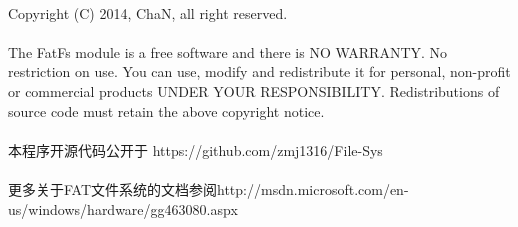 \documentclass{report}
\begin{document}
\begin{CJK}{GBK}{hei}
\paragraph{}
Copyright (C) 2014, ChaN, all right reserved.
\paragraph{}
The FatFs module is a free software and there is NO WARRANTY.
No restriction on use. You can use, modify and redistribute it for
personal, non-profit or commercial products UNDER YOUR RESPONSIBILITY.
Redistributions of source code must retain the above copyright notice.
\paragraph{}
本程序开源代码公开于 https://github.com/zmj1316/File-Sys
\paragraph{}
更多关于FAT文件系统的文档参阅http://msdn.microsoft.com/en-us/windows/hardware/gg463080.aspx
\end{CJK}
\end{document}
